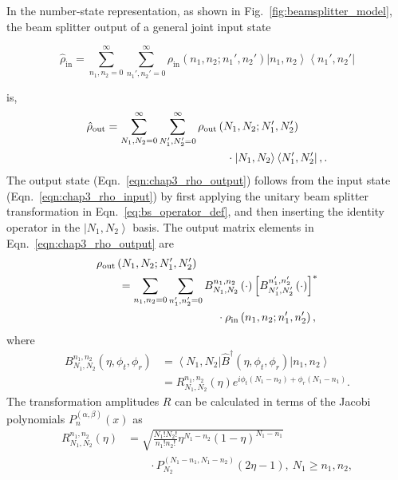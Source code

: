\documentclass[aps,twocolumn,secnumarabic,amsmath,amssymb,pra,groupedaddress,
showpacs, showkeys,draft]{revtex4-1}
\newcommand{\bra}[1]{\left\langle #1 \right|}
\newcommand{\ket}[1]{\left|#1\right\rangle}
\newcommand{\pna}[1]{\left(#1\right)}
\newcommand{\pnb}[1]{\left[#1\right]}
\newcommand{\eqn}[1]{
\begin{equation}
	#1
\end{equation}
}
\newcommand{\abs}[1]{\left|#1\right|}
\begin{document}
In the number-state representation, as shown in
Fig.~\ref{fig:beamsplitter_model}, the beam splitter output of a general joint
input state
\eqn{
\hat{\rho}_{\textrm{in}}=\sum_{n_1,n_2=0}^{\infty}\sum_{n_1',n_2'=0}^{\infty}
\rho_{\textrm{in}}\pna{n_1,n_2;n_1',n_2'}\ket{n_1,n_2}\bra{n_1',n_2'} \label{eqn:chap3_rho_input}
}
is,
\begin{align}
\hat{\rho}_{\textrm{out}} & =\sum_{N_1,N_2=0}^{\infty}\sum_{N_1',N_2'=0}^{\infty}
\rho_{\textrm{out}}\pna{N_1,N_2;N_1',N_2'} \nonumber \\ & \hspace{1.5in} \cdot\ket{N_1,N_2}\bra{N_1',N_2'},\label{eqn:chap3_rho_output}.
\end{align}
The output state (Eqn.~\ref{eqn:chap3_rho_output}) follows from the input state
(Eqn.~\ref{eqn:chap3_rho_input}) by first applying the unitary beam splitter
transformation in Eqn.~\ref{eq:bs_operator_def}, and then inserting the
identity operator in the $\ket{N_1,N_2}$ basis. The output matrix elements in
Eqn.~\ref{eqn:chap3_rho_output} are
\begin{align}
& \rho_{\textrm{out}}\pna{N_1,N_2;N_1',N_2'} \nonumber \\ & \qquad
=\sum_{n_1,n_2=0}\sum_{n_1',n_2'=0}
B_{N_1,N_2}^{n_1,n_2}\pna{\cdot}\pnb{B_{N_1',N_2'}^{n_1',n_2'}\pna{\cdot}}^{*}
\nonumber \\ & \hspace{1.5in}\cdot\rho_{\textrm{in}}\pna{n_1,n_2;n_1',n_2'},\label{eq:rho_output}
\end{align}
where
\begin{align}
B_{N_1,N_2}^{n_1,n_2}\pna{\eta,\phi_t,\phi_r} &= \bra{N_1,N_2}\hat{B}^{\dagger}\pna{\eta,\phi_t,\phi_r}\ket{n_1,n_2}\nonumber \\
& =R_{N_1,N_2}^{n_1,n_2}\pna{\eta} e^{i{\phi_t\pna{N_1-n_2}+\phi_r\pna{N_1-n_1}}}.
\end{align}
The transformation amplitudes $R$ can be calculated in terms of the Jacobi
polynomials $P_n^{\pna{\alpha,\beta}}\pna{x}$ as
\begin{align}
	R_{N_1,N_2}^{n_1,n_2}\pna{\eta}& =\sqrt{\frac{N_1!N_2!}{n_1!n_2!}
          \eta^{N_1-n_2}\pna{1-\eta}^{N_1-n_1}} \nonumber \\ & \qquad \cdot P_{N_2}^{\pna{N_1-n_1,N_1-n_2}}\pna{2\eta-1},~N_1\geq n_1,n_2,  \label{eqn:coefficient_value}
\end{align}
\end{document}
